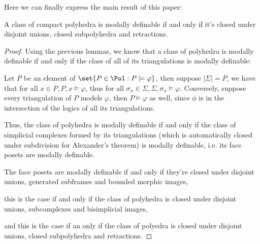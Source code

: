 Here we can finally express the main result of this paper:
\begin{theorem}\hfill 

A class of compact polyhedra is modally definable if and only if it's closed under disjoint unions, closed subpolyhedra and retractions. 
\end{theorem}
\begin{proof}\hfill 

   Using the previous lemmas, we know that a class of polyhedra is modally definable if and only if the class of all of its triangulations is modally definable:

   Let $P$ be an element of $\set{P\in\Pol: P\models\varphi}$, then suppose $|\Sigma|=P$, we have that for all $x\in P, P,x\models\varphi$, 
   thus for all $\sigma_x\in \Sigma, \Sigma,\sigma_x\models\varphi$. Conversely, suppose every triangulation of $P$ models $\varphi$, then $P\models\varphi$ as well, since
   $\phi$ is in the intersection of the logics of all its triangulations.
   
   Thus, the class of polyhedra is modally definable if and only if the class of simplicial complexes formed by its triangulations (which is automatically closed under subdivision for Alexander's theorem)
   is modally definable, i.e. its face posets are modally definable.  
   
   The face posets are modally definable if and only if they're closed under disjoint unions, generated subframes and bounded morphic images,
   
   this is the case if and only if the class of polyhedra is closed under disjoint unions, subcomplexes and bisimplicial images,

   and this is the case if an only if the class of polyedra is closed under disjoint unions, closed subpolyhedra and retractions.
\end{proof}